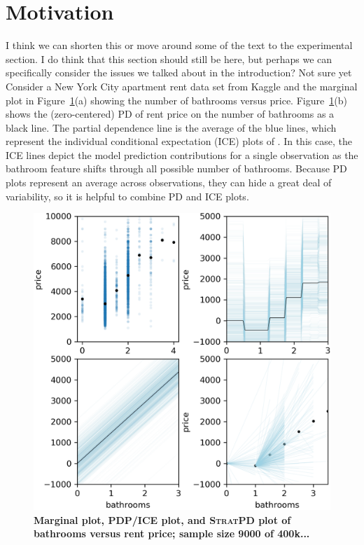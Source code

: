 \documentclass[12pt]{article}
\newcommand{\figref}[1]{Figure~\ref{#1}}
\newcommand{\cut}[1]{}
\newcommand{\spd}{\fontfamily{cmr}\textsc{\small StratPD}}
\begin{document}
\section{Motivation}\label{sec:motivation}
\cut{\cite{PDP} introduced partial dependence (PD) plots as a way to extract and visualize the dependence of the target on one or two features of interest.} {\color{red} I think we can shorten this or move around some of the text to the experimental section. I do think that this section should still be here, but perhaps we can specifically consider the issues we talked about in the introduction? Not sure yet} Consider a New York City apartment rent data set from Kaggle \cite{rent-dataset} and the marginal plot in \figref{fig:baths_price}(a) showing the number of bathrooms versus price.  \figref{fig:baths_price}(b) shows the (zero-centered) PD of rent price on the number of bathrooms as a black line. The partial dependence line is the average of the blue lines, which represent the individual conditional expectation (ICE) plots of \cite{ICE}.  In this case, the ICE lines depict the model prediction contributions for a single observation as the bathroom feature shifts through all possible number of bathrooms. Because PD plots represent an average across observations, they can hide a great deal of variability, so it is helpful to combine PD and ICE plots.

\begin{figure}[htbp]
\begin{center}
\includegraphics[scale=0.7]{images/bathrooms_vs_price.png}
\caption{{\bf  Marginal plot, PDP/ICE plot, and \spd{} plot of bathrooms versus rent price; sample size 9000 of 400k...}}
\label{fig:baths_price}
\end{center}
\end{figure}
\end{document}
